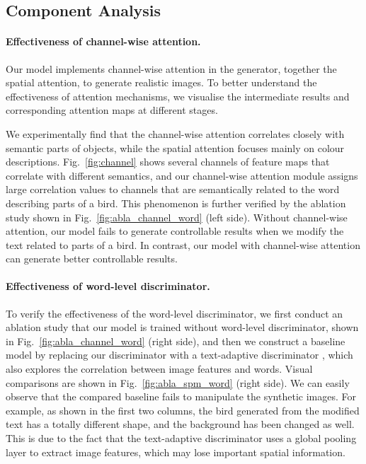 \subsection{Component Analysis}

\paragraph{Effectiveness of channel-wise attention.} Our model implements channel-wise attention in the generator, together the spatial attention, to generate realistic images. To better understand the effectiveness of attention mechanisms, we visualise the intermediate results and corresponding attention maps at different stages.

We experimentally find that the channel-wise attention correlates closely with semantic parts of objects, while the spatial attention focuses mainly on colour descriptions. Fig.~\ref{fig:channel} shows several channels of feature maps that correlate with different semantics, and our channel-wise attention module assigns large correlation values to channels that are semantically related to the word describing parts of a bird. This phenomenon is further verified by the ablation study shown in Fig.~\ref{fig:abla_channel_word} (left side). Without channel-wise attention, our model fails to generate controllable results when we modify the text related to parts of a bird. In contrast, our model with channel-wise attention can generate better controllable results.

\paragraph{Effectiveness of word-level discriminator.} To verify the effectiveness of the word-level discriminator, we first conduct an ablation study that our model is trained without word-level discriminator, shown in Fig.~\ref{fig:abla_channel_word} (right side), and then we construct a baseline model by replacing our discriminator with a text-adaptive discriminator \cite{nam2018text}, which also explores the correlation between image features and words. Visual comparisons are shown in Fig.~\ref{fig:abla_spm_word} (right side). We can easily observe that the compared baseline fails to manipulate the synthetic images. For example, as shown in the first two columns, the bird generated from the modified text has a totally different shape, and the background has been changed as well. This is due to the fact that the text-adaptive discriminator \cite{nam2018text} uses a global pooling layer to extract image features, which may lose important spatial information.

